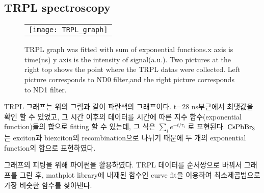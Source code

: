 \subsection{TRPL spectroscopy}
\begin{figure}[h]
	\begin{center}
		\begin{tabular}{c}
			\texttt{[image: TRPL\_graph]}
		\end{tabular}
		\caption{TRPL graph was fitted with sum of exponential functions.x axis is time(ns) y axis is the intensity of signal(a.u.). Two pictures at the right top shows the point where the TRPL datas were collected. Left picture corresponds to ND0 filter,and the right picture corresponds to ND1 filter. }	
		\label{fig:FIR221}
	\end{center}
\end{figure}
TRPL 그래프는 위의 그림과 같이 파란색의 그래프이다. t=28 ns부근에서 최댓값을 확인 할 수 있었고, 그 시간 이후의 데이터를 시간에 따른 지수 함수(exponential function)들의 합으로 fitting 할 수 있는데, 그 식은 $\sum_{i}^{} {e}^{-t/{\tau}_{i}}$ 로 표현된다. $\rm{CsPbBr_3}$는 exciton과 biexciton의 recombination으로 나뉘기 때문에 두 개의 exponential function의 합으로 표현하였다. 

그래프의 피팅을 위해 파이썬을 활용하였다. TRPL 데이터를 순서쌍으로 바꿔서 그래프를 그린 후, mathplot library에 내재된 함수인 curve fit을 이용하여 최소제곱법으로 가장 비슷한 함수를 찾아낸다.

